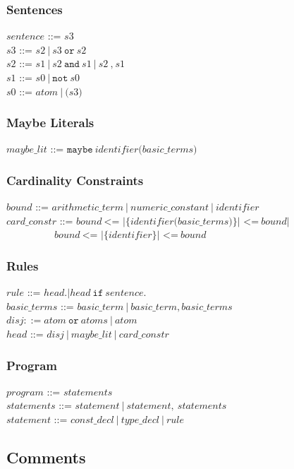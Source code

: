 \documentclass[a4paper,10pt]{article}
\begin{document}
\subsubsection{Sentences}

$sentence$ ::= $s3$ \\
$s3$ ::= $s2~|~s3~\texttt{or}~s2$\\
$s2$ ::= $s1~|~s2~\texttt{and}~s1~|~s2~\texttt{,}~s1$
\\
$s1$ ::= $s0~|~\texttt{not}~s0$\\ 
$s0$ ::= $atom~|~\texttt{(}s3\texttt{)}$ 
\subsubsection{Maybe Literals}
$maybe\_lit$ ::= $\texttt{maybe}~identifier \texttt{(} basic\_terms \texttt{)}$
\subsubsection{Cardinality Constraints}
$bound$ ::= $arithmetic\_term~|~numeric\_constant~|~identifier$\\
$card\_constr$ ::= $bound~ \texttt{<= |\{} identifier \texttt{(} basic\_terms \texttt{)} \texttt{\}| <=} ~bound | $\\
$~~~~~~~~~~~~~~~~~~~~~~bound~ \texttt{<= |\{} identifier\texttt{\}| <=}~ bound$
\subsubsection{Rules}
$rule$ ::= $head \texttt{.} | head~\texttt{if}~sentence \texttt{.} $ \\
$basic\_terms$ ::= $basic\_term~|~basic\_term, basic\_terms$ \\
$disj ::= atom~\texttt{or}~atoms~|~atom$\\
$head$ ::= $disj~|~maybe\_lit~|~card\_constr$
 
\subsubsection{Program}
$program$ ::= $statements$\\
$statements$ ::= $statement~|~statement,~statements$\\
$statement$ ::= $ const\_decl~|~type\_decl~|~rule$ 


\subsection{Comments}
\end{document}
